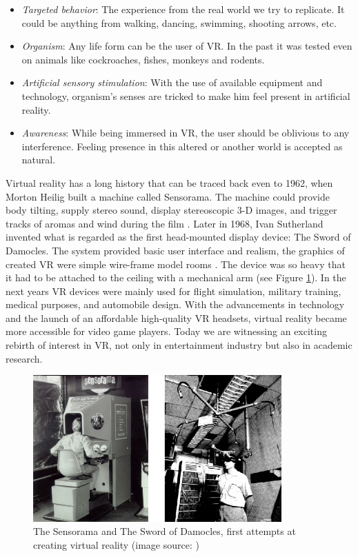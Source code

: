 \begin{itemize}
\item \textit{Targeted behavior}: The experience from the real world we try to replicate. It could be anything from walking, dancing, swimming, shooting arrows, etc.
\item \textit{Organism}: Any life form can be the user of VR. In the past it was tested even on animals like cockroaches, fishes, monkeys and rodents.
\item \textit{Artificial sensory stimulation}: With the use of available equipment and technology, organism’s senses are tricked to make him feel present in artificial reality.
\item \textit{Awareness}: While being immersed in VR, the user should be oblivious to any interference. Feeling presence in this altered or another world is accepted as natural.
\end{itemize}

Virtual reality has a long history that can be traced back even to 1962, when Morton Heilig built a machine called Sensorama. The machine could provide body tilting, supply stereo sound, display stereoscopic 3-D images, and trigger tracks of aromas and wind during the film \cite{SENSORAMA}. Later in 1968, Ivan Sutherland invented what is regarded as the first head-mounted display device: The Sword of Damocles. The system provided basic user interface and realism, the graphics of created VR were simple wire-frame model rooms \cite{DAMOCLES}. The device was so heavy that it had to be attached to the ceiling with a mechanical arm (see Figure \ref{fig:FIRST_VR}). In the next years VR devices were mainly used for flight simulation, military training, medical purposes, and automobile design. With the advancements in technology and the launch of an affordable high-quality VR headsets, virtual reality became more accessible for video game players. Today we are witnessing an exciting rebirth of interest in VR, not only in entertainment industry but also in academic research.

\begin{figure}[th]
\centering
\includegraphics[width=0.85\textwidth]{img/first_vr.png}
\caption{The Sensorama and The Sword of Damocles, first attempts at creating virtual reality (image source: \cite{SENSORAMA_IMAGE}\cite{DAMOCLES})}
\label{fig:FIRST_VR}
\end{figure}

